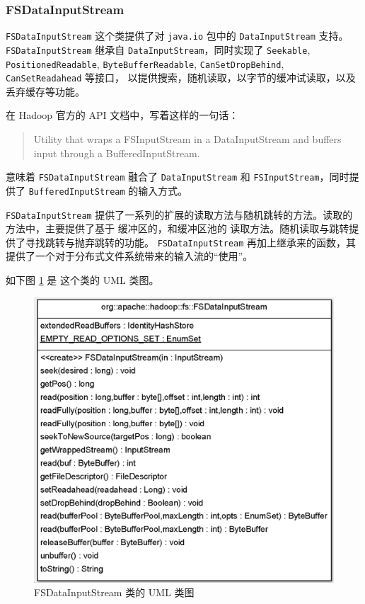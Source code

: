 
\subsubsection{FSDataInputStream}
\label{sec:uml:input:fsdatainputstream}

\lstinline{FSDataInputStream} 这个类提供了对 \lstinline|java.io| 包中的 \lstinline|DataInputStream| 支持。
\lstinline{FSDataInputStream} 继承自 \lstinline|DataInputStream|，同时实现了 \lstinline|Seekable|, \lstinline|PositionedReadable|, \lstinline|ByteBufferReadable|, \lstinline|CanSetDropBehind|, \lstinline|CanSetReadahead| 等接口，
以提供搜索，随机读取，以字节的缓冲试读取，以及丢弃缓存等功能。

在 Hadoop 官方的 API 文档中，写着这样的一句话：
\begin{quote}
    Utility that wraps a FSInputStream in a DataInputStream and buffers input through a BufferedInputStream.
\end{quote}
意味着 \lstinline|FSDataInputStream| 融合了 \lstinline|DataInputStream| 和 \lstinline|FSInputStream|，同时提供了
\lstinline|BufferedInputStream| 的输入方式。

\lstinline|FSDataInputStream| 提供了一系列的扩展的读取方法与随机跳转的方法。读取的方法中，主要提供了基于 缓冲区的，和缓冲区池的
读取方法。随机读取与跳转提供了寻找跳转与抛弃跳转的功能。
\lstinline|FSDataInputStream| 再加上继承来的函数，其提供了一个对于分布式文件系统带来的输入流的“使用”。

如下图 \ref{fig:fsdatainputstream} 是 这个类的 UML 类图。
\begin{figure}
\centering
\includegraphics[width=1\linewidth]{UML/inputstream/fsdatainputstream}
\caption{FSDataInputStream 类的 UML 类图}
\label{fig:fsdatainputstream}
\end{figure}


